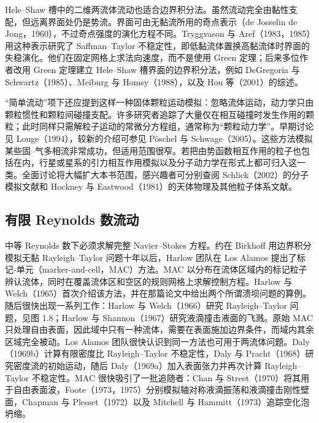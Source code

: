 \documentclass[11pt,a4paper,openany,fontset=none]{ctexbook}
\newenvironment{sourceblock}
  {\par\addvspace{0.65\baselineskip}\noindent\begin{minipage}{\linewidth}\centering}
  {\end{minipage}\par\addvspace{0.48\baselineskip}}
\begin{document}
Hele--Shaw 槽中的二维两流体流动也适合边界积分法。虽然流动完全由黏性支配，但远离界面处仍是势流。界面可由无黏流所用的奇点表示（de Josselin de Jong，1960），不过奇点强度的演化方程不同。Tryggvason 与 Aref（1983，1985）用这种表示研究了 Saffman--Taylor 不稳定性，即低黏流体置换高黏流体时界面的失稳演化。他们在固定网格上求法向速度，而不是使用 Green 定理；后来多位作者改用 Green 定理建立 Hele--Shaw 槽界面的边界积分法，例如 DeGregoria 与 Schwartz（1985）、Meiburg 与 Homsy（1988），以及 Hou 等（2001）的综述。

“简单流动”项下还应提到这样一种固体颗粒运动模拟：忽略流体运动，动力学只由颗粒惯性和颗粒间碰撞支配。许多研究者追踪了大量仅在相互碰撞时发生作用的颗粒；此时同样只需解粒子运动的常微分方程组，通常称为“颗粒动力学”。早期讨论见 Louge（1994），较新的介绍可参见 P\"oschel 与 Schwage（2005）。这些方法模拟某些固--气多相流非常成功，但适用范围很窄。若把由势函数相互作用的粒子也包括在内，行星或星系的引力相互作用模拟以及分子动力学在形式上都可归入这一类。全面讨论将大幅扩大本书范围，感兴趣者可分别查阅 Schlick（2002）的分子模拟文献和 Hockney 与 Eastwood（1981）的天体物理及其他粒子体系文献。

\subsection{有限 Reynolds 数流动}


中等 Reynolds 数下必须求解完整 Navier--Stokes 方程。约在 Birkhoff 用边界积分模拟无黏 Rayleigh--Taylor 问题十年以后，Harlow 团队在 Los Alamos 提出了标记-单元（marker-and-cell，MAC）方法。MAC 以分布在流体区域内的标记粒子辨认流体，同时在覆盖流体区和空区的规则网格上求解控制方程。Harlow 与 Welch（1965）首次介绍该方法，并在那篇论文中给出两个所谓溃坝问题的算例。随后很快出现一系列工作：Harlow 与 Welch（1966）研究 Rayleigh--Taylor 问题，见图 1.8；Harlow 与 Shannon（1967）研究液滴撞击液面的飞溅。原始 MAC 只处理自由表面，因此域中只有一种流体，需要在表面施加边界条件，而域内其余区域完全被动。Los Alamos 团队很快认识到同一方法也可用于两流体问题。Daly（1969b）计算有限密度比 Rayleigh--Taylor 不稳定性，Daly 与 Pracht（1968）研究密度流的初始运动，随后 Daly（1969a）加入表面张力并再次计算 Rayleigh--Taylor 不稳定性。MAC 很快吸引了一批追随者：Chan 与 Street（1970）将其用于自由表面波，Foote（1973，1975）分别模拟轴对称液滴振荡和液滴撞击刚性壁面，Chapman 与 Plesset（1972）以及 Mitchell 与 Hammitt（1973）追踪空化泡坍缩。

\begin{sourceblock}
\end{sourceblock}
\end{document}
